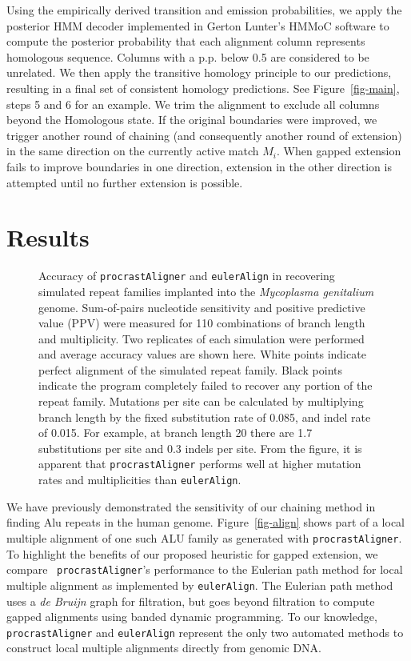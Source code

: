 \documentclass{ws-procs975x65}
\begin{document}
Using the empirically derived transition and emission probabilities, we apply the posterior HMM decoder implemented in Gerton Lunter's HMMoC software\cite{hmmoc} to compute the posterior probability that each alignment column represents homologous sequence.  Columns with a p.p. below 0.5 are considered to be unrelated.  We then apply the transitive homology principle to our predictions, resulting in a final set of consistent homology predictions.  See Figure~\ref{fig-main}, steps 5 and 6 for an example. We trim the alignment to exclude all columns beyond the Homologous state. If the original boundaries were improved, we trigger another round of chaining (and consequently another round of extension) in the same direction on the currently active match $M_i$.  When gapped extension fails to improve boundaries in one direction, extension in the other direction is attempted until no further extension is possible.


\section{Results}
\begin{figure}[t]
\centering {}
\caption{Accuracy of \texttt{procrastAligner} and \texttt{eulerAlign} in recovering simulated repeat families implanted into the \textit{Mycoplasma genitalium} genome.  Sum-of-pairs nucleotide sensitivity and positive predictive value (PPV) were measured for 110 combinations of branch length and multiplicity.  Two replicates of each simulation were performed and
average accuracy values are shown here.  White points indicate perfect alignment of the simulated repeat family.  Black points indicate the program completely failed to recover any portion of the repeat family.  Mutations per site can be calculated by multiplying branch length by the fixed substitution rate of 0.085, and indel rate of 0.015.
For example, at branch length 20 there are 1.7 substitutions per site and 0.3 indels per site.
From the figure, it is apparent that \texttt{procrastAligner} performs well at higher mutation rates and multiplicities than \texttt{eulerAlign}.}
\label{fig-results}\vspace{-0.2cm}
\end{figure}

We have previously demonstrated the sensitivity of our chaining method in finding Alu repeats in
the human genome\cite{ref-procrast}. Figure~\ref{fig-align} shows part of a  local multiple alignment of one such ALU family as generated with \texttt{procrastAligner}. To highlight the benefits of our proposed heuristic for gapped extension, we compare ~\texttt{procrastAligner}'s performance to the Eulerian path method for local multiple alignment as implemented by \texttt{eulerAlign}\cite{ref-related1}. The Eulerian path method uses
a \textit{de Bruijn} graph for filtration, but goes beyond filtration to compute gapped alignments using banded dynamic
programming.  To our knowledge, \texttt{procrastAligner} and \texttt{eulerAlign} represent the only two automated methods to construct local multiple alignments directly from genomic DNA.
\end{document}
